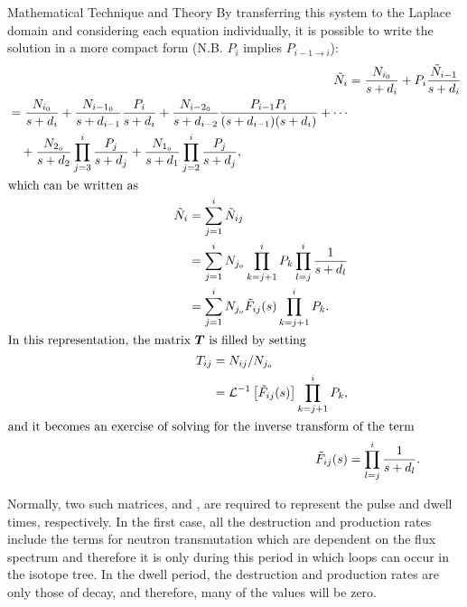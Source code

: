 \begin{chapter}{Mathematical Technique and Theory}
By transferring this system to the Laplace domain and considering each
equation individually, it is possible to write the solution in a more
compact form (N.B. $P_{i}$ implies $P_{i-1 \rightarrow i}$):
\begin{align}
  \tilde{N}_i &= \frac{N_{i_0}}{s+d_i} + P_i
  \frac{\tilde{N}_{i-1}}{s+d_i}\\
  \begin{split}
    &= \frac{N_{i_0}}{s+d_i} + 
    \frac{N_{i-1_0}}{s+d_{i-1}}\frac{P_i}{s+d_i} +
    \frac{N_{i-2_0}}{s+d_{i-2}}\frac{P_{i-1}P_i}{(s+d_{i-1})(s+d_i)} + 
    \cdots\\
    &\quad+\frac{N_{2_o}}{s+d_2}\prod_{j=3}^i\frac{P_{j}}{s+d_{j}} +
    \frac{N_{1_o}}{s+d_1}\prod_{j=2}^i\frac{P_j}{s+d_{j}},\\
  \end{split}\\
  \intertext{which can be written as}
  \begin{split}
    \tilde{N}_i & = \sum_{j=1}^i \tilde{N}_{ij} \\
    & = \sum_{j=1}^i N_{j_o} \prod_{k=j+1}^i P_k \prod_{l=j}^i
    \frac{1}{s+d_l} \\
    & = \sum_{j=1}^i N_{j_o} \tilde{F}_{ij}(s)
    \prod_{k=j+1}^i P_k.\label{eq:math.full.prob}\\
  \end{split}\\
  \intertext{In this representation, the matrix \mbox{\boldmath $T$} is filled by setting}
  \begin{split}
    T_{ij} &= N_{ij}/N_{j_o}\\ &=
    \mathcal{L}^{-1}\left[\tilde{F}_{ij}(s)\right] \prod_{k=j+1}^{i}
    P_k,\\
  \end{split}\label{eq:math.intro.filler}\\
  \intertext{and it becomes an exercise of solving for the inverse
    transform of the term}
  \tilde{F}_{ij}(s) &= \prod_{l=j}^i \frac{1}{s+d_l}\label{eq:math.root.prob}.
\end{align}

Normally, two such matrices,  and , are required to
represent the pulse and dwell times, respectively.  In the first case,
all the destruction and production rates include the terms for neutron
transmutation which are dependent on the flux spectrum and therefore
it is only during this period in which loops can occur in the isotope
tree.  In the dwell period, the destruction and production rates are
only those of decay, and therefore, many of the values will be zero.


\end{chapter}
